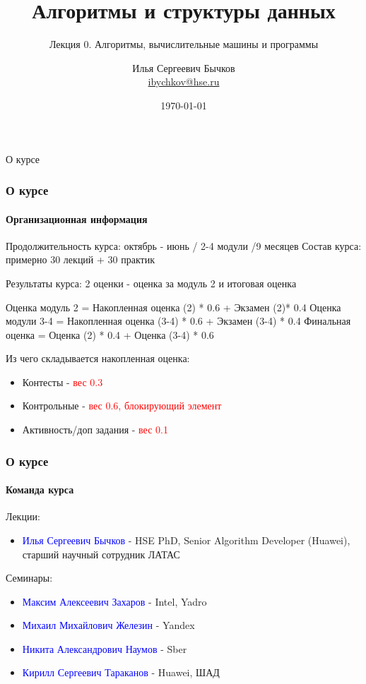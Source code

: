 \documentclass[aspectratio=169]{beamer}
\title[Title]{Алгоритмы и структуры данных}
\subtitle{Лекция 0. Алгоритмы, вычислительные машины и программы}
\author[Author's name]{Илья Сергеевич Бычков\\ \smallskip \scriptsize \url{ibychkov@hse.ru}}
\institute{НИУ ВШЭ - Нижний Новгород}
\date{\today}
\begin{document}
\frame[plain]{\titlepage}


\begin{frame}[c]

\begin{center}
\Huge О курсе
\end{center}

\end{frame}

\begin{frame}
\frametitle{О курсе}
\framesubtitle{Организационная информация}

Продолжительность курса: \quad октябрь - июнь / 2-4 модули /9 месяцев\newline
Состав курса: \quad примерно 30 лекций + 30 практик\newline

Результаты курса: 2 оценки  - оценка за модуль 2 и итоговая оценка\newline

Оценка модуль 2 = Накопленная оценка (2) * 0.6 + Экзамен (2)* 0.4\newline
Оценка модули 3-4 = Накопленная оценка (3-4) * 0.6 + Экзамен (3-4) * 0.4\newline
Финальная оценка = Оценка (2) * 0.4 + Оценка (3-4) * 0.6\newline

Из чего складывается накопленная оценка:
\begin{itemize}
  \item{Контесты - \textcolor{red}{вес 0.3}}
  \item{Контрольные - \textcolor{red}{вес 0.6, блокирующий элемент}}
  \item{Активность/доп задания - \textcolor{red}{вес 0.1}}
\end{itemize}
\end{frame}


\begin{frame}
\frametitle{О курсе}
\framesubtitle{Команда курса}
Лекции:
\begin{itemize}
\item{\textcolor{blue}{Илья Сергеевич Бычков} - HSE PhD, Senior Algorithm Developer (Huawei), старший научный сотрудник ЛАТАС}
\end{itemize}
Семинары:
\begin{itemize}
  \item{\textcolor{blue}{Максим Алексеевич Захаров} - Intel, Yadro}
  \item{\textcolor{blue}{Михаил Михайлович Железин} - Yandex}
  \item{\textcolor{blue}{Никита Александрович Наумов} - Sber}
  \item{\textcolor{blue}{Кирилл Сергеевич Тараканов} - Huawei, ШАД}
\end{itemize}
\end{frame}
\end{document}
